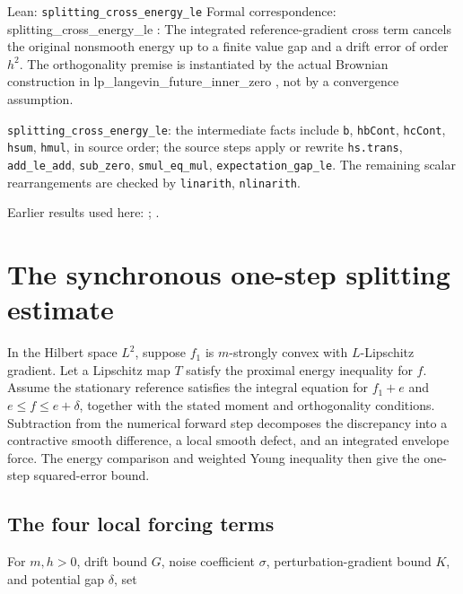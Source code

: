 \documentclass[11pt,a4paper]{report}
\begin{document}
\begin{leanbox}{Lean: \texttt{splitting\_\allowbreak{}cross\_\allowbreak{}energy\_\allowbreak{}le}}
Formal correspondence: splitting\_cross\_energy\_le : The integrated reference-gradient cross term cancels the original nonsmooth energy up to a finite value gap and a drift error of order \(h^2\). The orthogonality premise is instantiated by the actual Brownian construction in lp\_langevin\_future\_inner\_zero , not by a convergence assumption.



\texttt{splitting\_\allowbreak{}cross\_\allowbreak{}energy\_\allowbreak{}le}: the intermediate facts include \texttt{b}, \texttt{hb\allowbreak{}Cont}, \texttt{hc\allowbreak{}Cont}, \texttt{hsum}, \texttt{hmul}, in source order; the source steps apply or rewrite \texttt{hs.\allowbreak{}trans}, \texttt{add\_\allowbreak{}le\_\allowbreak{}add}, \texttt{sub\_\allowbreak{}zero}, \texttt{smul\_\allowbreak{}eq\_\allowbreak{}mul}, \texttt{expectation\_\allowbreak{}gap\_\allowbreak{}le}. The remaining scalar rearrangements are checked by \texttt{linarith}, \texttt{nlinarith}.
\end{leanbox}


Earlier results used here: \cite[Section~3.13.2]{LangevinLean2026ULASC}; \cite[Section~3.13.5]{LangevinLean2026ULASC}.
\section{\texorpdfstring{The synchronous one-step splitting estimate}{The synchronous one-step splitting estimate}}
\label{proof-module-ProximalLangevin-SplittingOneStep-lean}


In the Hilbert space \(L^2\), suppose \(f_1\) is \(m\)-strongly convex with \(L\)-Lipschitz gradient. Let a Lipschitz map \(T\) satisfy the proximal energy inequality for \(f\). Assume the stationary reference satisfies the integral equation for \(f_1+e\) and \(e\le f\le e+\delta\), together with the stated moment and orthogonality conditions. Subtraction from the numerical forward step decomposes the discrepancy into a contractive smooth difference, a local smooth defect, and an integrated envelope force. The energy comparison and weighted Young inequality then give the one-step squared-error bound.

\subsection{\texorpdfstring{The four local forcing terms}{The four local forcing terms}}
\label{report-step-ProximalLangevin-SplittingOneStep-lean-1}


For \(m,h>0\), drift bound \(G\), noise coefficient \(\sigma\), perturbation-gradient bound \(K\), and potential gap \(\delta\), set
\end{document}

